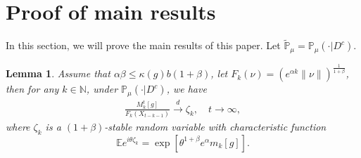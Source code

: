 \documentclass{article}
\newtheorem{lemma}{Lemma}[section]
\begin{document}
\section{Proof of main results}

In this section, we will prove the main results of this paper. Let $\mathbb{\tilde{P}}_{\mu}=\mathbb{P}_{\mu}(\cdot|D^c)$.
 \begin{lemma}\label{lemma31}
 Assume that $\alpha\beta\leq \kappa(g)b(1+\beta)$, let $F_k(\nu)=\left(e^{\alpha k}\|\nu\|\right)^{\frac{1}{1+\beta}}$, then for any  $k\in\mathbb{N}$, under $\mathbb{P}_{\mu}(\cdot | D ^c)$, we have
 \begin{align}
      \frac{M_k^t[g]}{F_k(X_{t-k-1})}\xrightarrow{d}\zeta_k, \quad t\rightarrow \infty, \label{limitdistribution1}
 \end{align}
 where $\zeta_k$ is a $(1+\beta)$-stable random variable with characteristic function
 $$\mathbb{E}e^{i\theta\zeta_k}=\exp\left[\theta^{1+\beta}e^{\alpha}m_k[g]\right].$$
 \end{lemma}
\end{document}
